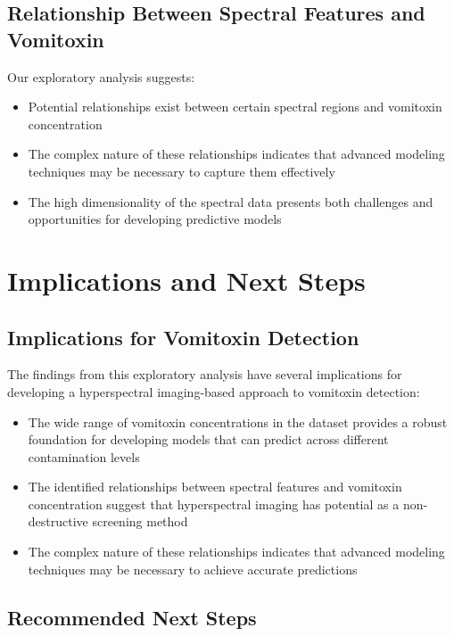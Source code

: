 \documentclass[12pt,a4paper]{article}
\begin{document}
\subsection{Relationship Between Spectral Features and Vomitoxin}

Our exploratory analysis suggests:

\begin{itemize}
    \item Potential relationships exist between certain spectral regions and vomitoxin concentration
    \item The complex nature of these relationships indicates that advanced modeling techniques may be necessary to capture them effectively
    \item The high dimensionality of the spectral data presents both challenges and opportunities for developing predictive models
\end{itemize}

\section{Implications and Next Steps}

\subsection{Implications for Vomitoxin Detection}

The findings from this exploratory analysis have several implications for developing a hyperspectral imaging-based approach to vomitoxin detection:

\begin{itemize}
    \item The wide range of vomitoxin concentrations in the dataset provides a robust foundation for developing models that can predict across different contamination levels
    \item The identified relationships between spectral features and vomitoxin concentration suggest that hyperspectral imaging has potential as a non-destructive screening method
    \item The complex nature of these relationships indicates that advanced modeling techniques may be necessary to achieve accurate predictions
\end{itemize}

\subsection{Recommended Next Steps}
\end{document}
